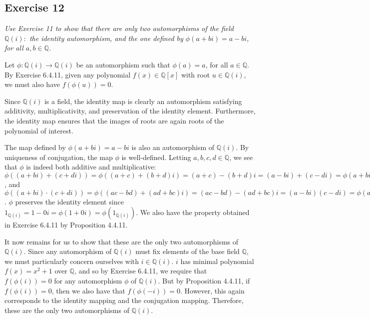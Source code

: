 \subsection*{Exercise 12}
\textit{Use Exercise 11 to show that there are only two automorphisms of the field $\mathbb{Q}(i):$ the identity automorphism, and the one defined by $\phi(a + bi) = a - bi$, for all $a, b \in \mathbb{Q}$.}

\vspace{5 mm}
Let $\phi: \mathbb{Q}(i) \rightarrow \mathbb{Q}(i)$ be an automorphism such that $\phi(a) = a$, for all $a \in \mathbb{Q}$. By Exercise 6.4.11, given any polynomial $f(x) \in \mathbb{Q}[x]$ with root $u \in \mathbb{Q}(i)$, we must also have $f(\phi(u)) = 0$.

Since $\mathbb{Q}(i)$ is a field, the identity map is clearly an automorphism satisfying additivity, multiplicativity, and preservation of the identity element. Furthermore, the identity map ensures that the images of roots are again roots of the polynomial of interest.

The map defined by $\phi(a + bi) = a - bi$ is also an automorphism of $\mathbb{Q}(i)$. By uniqueness of conjugation, the map $\phi$ is well-defined. Letting $a,b,c,d \in \mathbb{Q}$, we see that $\phi$ is indeed both additive and multiplicative: $\phi((a+bi) + (c+di)) = \phi((a+c) + (b+d)i) = (a+c) - (b+d)i = (a-bi) + (c-di) = \phi(a+bi) + \phi(c+di)$, and $\phi((a+bi)\cdot(c+di)) = \phi((ac-bd)+(ad+bc)i) = (ac-bd) - (ad+bc)i = (a-bi)(c-di) = \phi(a+bi)\phi(c+di)$. $\phi$ preserves the identity element since $1_{\mathbb{Q}(i)} = 1 - 0i = \phi(1+0i) = \phi(1_{\mathbb{Q}(i)})$. We also have the property obtained in Exercise 6.4.11 by Proposition 4.4.11.

It now remains for us to show that these are the only two automorphisms of $\mathbb{Q}(i)$. Since any automorphism of $\mathbb{Q}(i)$ must fix elements of the base field $\mathbb{Q}$, we must particularly concern ourselves with $i \in \mathbb{Q}(i)$. $i$ has minimal polynomial $f(x) = x^2 + 1$ over $\mathbb{Q}$, and so by Exercise 6.4.11, we require that $f(\phi(i)) = 0$ for any automorphism $\phi$ of $\mathbb{Q}(i)$. But by Proposition 4.4.11, if $f(\phi(i)) = 0$, then we also have that $f(\phi(-i)) = 0$. However, this again corresponds to the identity mapping and the conjugation mapping. Therefore, these are the only two automorphisms of $\mathbb{Q}(i)$.